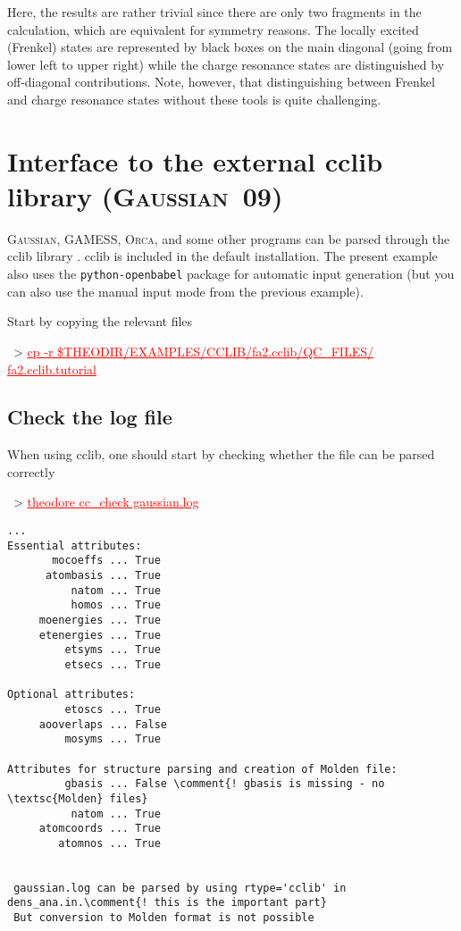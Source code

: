 \documentclass[DIV=12,headings=normal]{scrartcl}
\newcommand{\comment}[1]{\textcolor{blue}{#1}}
\newcommand{\redl}[1]{{\textcolor{red}{\underline{#1}}}}
\newcommand{\comm}[1]{
\small
~> \redl{#1}
\normalsize
}
\begin{document}
Here, the results are rather trivial since there are only two fragments in the calculation, which are equivalent for symmetry reasons.
The locally excited (Frenkel) states are represented by black boxes on the main diagonal (going from lower left to upper right) while the charge resonance states are distinguished by off-diagonal contributions.
Note, however, that distinguishing between Frenkel and charge resonance states without these tools is quite challenging.

\section{Interface to the external cclib library (\textsc{Gaussian~09})}
\textsc{Gaussian}, GAMESS, \textsc{Orca}, and some other programs can be parsed through the cclib library \cite{cclib}.
cclib is included in the default installation.
The present example also uses the \texttt{python-openbabel} package for automatic input generation (but you can also use the manual input mode from the previous example).

Start by copying the relevant files

\comm{cp -r \$THEODIR/EXAMPLES/CCLIB/fa2.cclib/QC\_FILES/ fa2.cclib.tutorial}

\subsection{Check the log file}
When using cclib, one should start by checking whether the file can be parsed correctly

\comm{theodore cc\_check gaussian.log}

\scriptsize
\begin{Verbatim}[commandchars=\\\{\}]
...
Essential attributes:
       mocoeffs ... True
      atombasis ... True
          natom ... True
          homos ... True
     moenergies ... True
     etenergies ... True
         etsyms ... True
         etsecs ... True

Optional attributes:
         etoscs ... True
     aooverlaps ... False
         mosyms ... True

Attributes for structure parsing and creation of Molden file:
         gbasis ... False \comment{! gbasis is missing - no \textsc{Molden} files}
          natom ... True
     atomcoords ... True
        atomnos ... True


 gaussian.log can be parsed by using rtype='cclib' in dens_ana.in.\comment{! this is the important part}
 But conversion to Molden format is not possible
\end{Verbatim}
\normalsize
\end{document}
